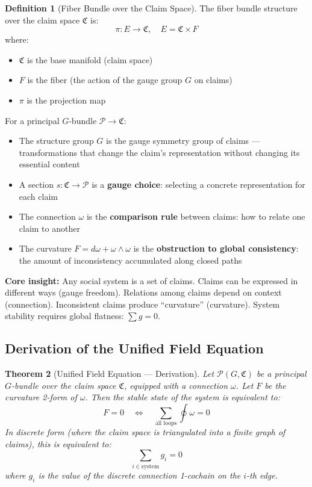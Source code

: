 \documentclass[12pt,a4paper]{article}
\theoremstyle{plain}
\newtheorem{theorem}{Theorem}[section]
\theoremstyle{definition}
\newtheorem{definition}[theorem]{Definition}
\newcommand{\Pcal}{\mathcal{P}}
\newcommand{\curv}{F}
\newcommand{\conn}{\omega}
\newcommand{\ClaimSpace}{\mathfrak{C}}
\begin{document}
\begin{definition}[Fiber Bundle over the Claim Space]
The fiber bundle structure over the claim space $\ClaimSpace$ is:
\begin{equation}
    \pi: E \to \ClaimSpace, \quad E = \ClaimSpace \times F
\end{equation}
where:
\begin{itemize}
    \item $\ClaimSpace$ is the base manifold (claim space)
    \item $F$ is the fiber (the action of the gauge group $G$ on claims)
    \item $\pi$ is the projection map
\end{itemize}

For a principal $G$-bundle $\Pcal \to \ClaimSpace$:
\begin{itemize}
    \item The structure group $G$ is the gauge symmetry group of claims — transformations that change the claim's representation without changing its essential content
    \item A section $s: \ClaimSpace \to \Pcal$ is a \textbf{gauge choice}: selecting a concrete representation for each claim
    \item The connection $\conn$ is the \textbf{comparison rule} between claims: how to relate one claim to another
    \item The curvature $\curv = d\conn + \conn \wedge \conn$ is the \textbf{obstruction to global consistency}: the amount of inconsistency accumulated along closed paths
\end{itemize}
\end{definition}

\textbf{Core insight:} Any social system is a set of claims.
Claims can be expressed in different ways (gauge freedom).
Relations among claims depend on context (connection).
Inconsistent claims produce ``curvature'' (curvature).
System stability requires global flatness: $\sum g = 0$.

\subsection{Derivation of the Unified Field Equation}

\begin{theorem}[Unified Field Equation — Derivation]
Let $\Pcal(G, \ClaimSpace)$ be a principal $G$-bundle over the claim space $\ClaimSpace$, equipped with a connection $\conn$.
Let $\curv$ be the curvature 2-form of $\conn$. Then the stable state of the system is equivalent to:
\begin{equation}
    \curv = 0 \quad \Longleftrightarrow \quad \sum_{\text{all loops}} \oint \conn = 0
\end{equation}
In discrete form (where the claim space is triangulated into a finite graph of claims), this is equivalent to:
\begin{equation}
    \sum_{i \in \text{system}} g_i = 0
\end{equation}
where $g_i$ is the value of the discrete connection 1-cochain on the $i$-th edge.
\end{theorem}
\end{document}
